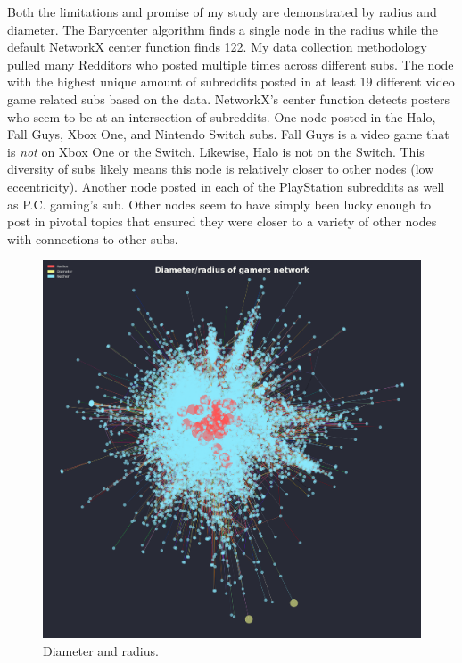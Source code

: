 \documentclass[12pt, a4paper]{article}
\begin{document}
Both the limitations and promise of my study are demonstrated by radius and diameter. The Barycenter algorithm finds a single node in the radius while the default NetworkX center function finds 122. My data collection methodology pulled many Redditors who posted multiple times across different subs. The node with the highest unique amount of subreddits posted in at least 19 different video game related subs based on the data. NetworkX's center function detects posters who seem to be at an intersection of subreddits. One node posted in the Halo, Fall Guys, Xbox One, and Nintendo Switch subs. Fall Guys is a video game that is \textit{not} on Xbox One or the Switch. Likewise, Halo is not on the Switch. This diversity of subs likely means this node is relatively closer to other nodes (low eccentricity). Another node posted in each of the PlayStation subreddits as well as P.C. gaming's sub. Other nodes seem to have simply been lucky enough to post in pivotal topics that ensured they were closer to a variety of other nodes with connections to other subs.

\begin{figure}[ht!]
  \centering
  \includegraphics[width=\textwidth]{network_diarad.png}
  \caption{Diameter and radius.}
  \label{fig:diarad}
\end{figure}
\end{document}
